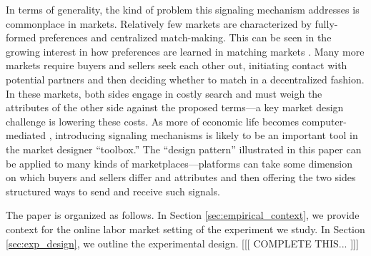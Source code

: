 In terms of generality, the kind of problem this signaling mechanism addresses is commonplace in markets.
Relatively few markets are characterized by fully-formed preferences and centralized match-making.
This can be seen in the growing interest in how preferences are learned in matching markets \citep{acemoglu2017, ashlagi2017communication}.
Many more markets require buyers and sellers seek each other out, initiating contact with potential partners and then deciding whether to match in a decentralized fashion.
In these markets, both sides engage in costly search and must weigh the attributes of the other side against the proposed terms---a key market design challenge is lowering these costs.
As more of economic life becomes computer-mediated \citep{varian2010computer}, introducing signaling mechanisms is likely to be an important tool in the market designer ``toolbox.''
The ``design pattern'' illustrated in this paper can be applied to many kinds of marketplaces---platforms can take some dimension on which buyers and sellers differ and attributes and then offering the two sides structured ways to send and receive such signals. 

The paper is organized as follows.
In Section \ref{sec:empirical_context}, we provide context for the online labor market setting of the experiment we study.
In Section \ref{sec:exp_design}, we outline the experimental design.
[[[ COMPLETE THIS... ]]]
